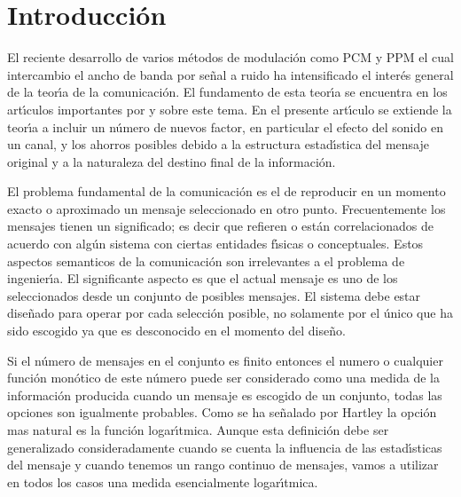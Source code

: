 \chapter*{Introducci\'{o}n}

El reciente desarrollo de varios m\'{e}todos de modulaci\'{o}n como
PCM y PPM el cual intercambio el ancho de banda por se\~{n}al a ruido
ha intensificado el inter\'{e}s general de la teor\'{\i}a de la
comunicaci\'{o}n. El fundamento de esta teor\'{\i}a se encuentra en
los art\'{\i}culos importantes por \citet{Nyquist1} y \citet{Hartley}
sobre este tema. En el presente art\'{\i}culo se extiende la
teor\'{\i}a a incluir un n\'{u}mero de nuevos factor, en particular el
efecto del sonido en un canal, y los ahorros posibles debido a la
estructura estad\'{\i}stica del mensaje original y a la naturaleza del
destino final de la informaci\'{o}n. 

El problema fundamental de la comunicaci\'{o}n es el de reproducir en
un momento exacto o aproximado un mensaje seleccionado en otro
punto. Frecuentemente los mensajes tienen un significado; es decir que
refieren o est\'{a}n correlacionados de acuerdo con alg\'{u}n sistema
con ciertas entidades f\'{\i}sicas o conceptuales. Estos aspectos
semanticos de la comunicaci\'{o}n son irrelevantes a el problema de
ingenier\'{\i}a. El significante aspecto es que el actual mensaje es
uno de los seleccionados desde un conjunto de posibles mensajes. El
sistema debe estar dise\~{n}ado para operar por cada selecci\'{o}n
posible, no solamente por el \'{u}nico que ha sido escogido ya que es
desconocido en el momento del dise\~{n}o.

Si el n\'{u}mero de mensajes en el conjunto es finito entonces el
numero o cualquier funci\'{o}n mon\'{o}tico de este n\'{u}mero puede
ser considerado como una medida de la informaci\'{o}n producida cuando
un mensaje es escogido de un conjunto, todas las opciones son
igualmente probables. Como se ha se\~{n}alado por Hartley la
opci\'{o}n mas natural es la funci\'{o}n logar\'{\i}tmica. Aunque esta
definici\'{o}n debe ser generalizado consideradamente cuando se cuenta
la influencia de las estad\'{\i}sticas del mensaje y cuando tenemos un
rango continuo de mensajes, vamos a utilizar en todos los casos una
medida esencialmente logar\'{\i}tmica.


